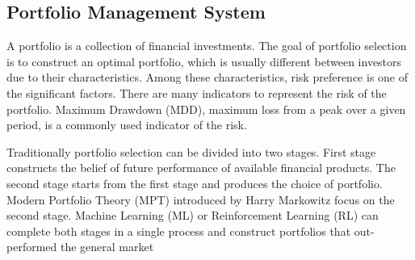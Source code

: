 \subsection {Portfolio Management System}
A portfolio is a collection of financial investments. The goal of portfolio selection is to construct an optimal portfolio, which is usually different between investors due to their characteristics. Among these characteristics, risk preference is one of the significant factors. There are many indicators to represent the risk of the portfolio. Maximum Drawdown (MDD),  maximum loss from a peak over a given period, is a commonly used indicator of the risk.

Traditionally portfolio selection can be divided into two stages. First stage constructs the belief of future performance of available financial products. The second stage starts from the first stage and produces the choice of portfolio.  Modern Portfolio Theory (MPT) introduced by  Harry Markowitz \cite{10.2307/2975974} focus on the second stage. Machine Learning (ML) or Reinforcement Learning (RL) can complete both stages in a single process and construct portfolios that out-performed the general market\cite{KRAUSS2017689}
